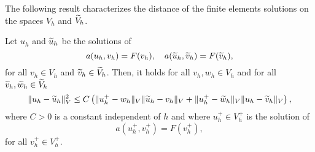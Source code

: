 \documentclass[10pt]{article}
\begin{document}
The following result characterizes the distance of the finite elements solutions on the spaces $V_h$ and $\widetilde V_h$.
\begin{lemma}\label{lem:ConvergenceGeneral} Let $u_h$ and $\widetilde u_h$ be the solutions of
	\begin{equation}
		a(u_h, v_h) = F(v_h), \quad a(\widetilde u_h, \widetilde v_h) = F(\widetilde v_h),
	\end{equation}
	for all $v_h \in V_h$ and $\widetilde v_h \in \widetilde V_h$. Then, it holds for all $v_h, w_h \in V_h$ and for all $\widetilde v_h, \widetilde w_h \in \widetilde V_h$
	\begin{equation}
	\begin{aligned}
	\lVert u_h - \widetilde u_h\rVert_V^2 \leq C \left(\lVert u_h^+ - w_h\rVert_V \lVert\widetilde u_h - v_h\rVert_V + \lVert u_h^+ - \widetilde w_h\rVert_V \lVert u_h - \widetilde v_h\rVert_V \right),
	\end{aligned}
	\end{equation}
	where $C > 0$ is a constant independent of $h$ and where $u_h^+ \in V_h^+$ is the solution of 
	\begin{equation}\label{eq:uHPlus}
		a(u_h^+ , v_h^+) = F(v_h^+),	
	\end{equation}
	for all $v_h^+ \in V_h^+$.
\end{lemma}
\end{document}
